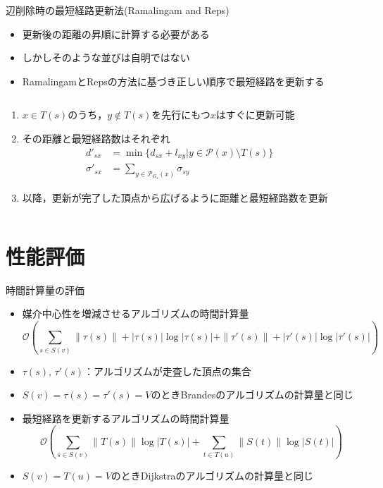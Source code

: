 \documentclass[dvipdfmx,fleqn]{beamer}
\begin{document}
\begin{frame}{辺削除時の最短経路更新法(Ramalingam and Reps)}
  \begin{itemize}
  \item 更新後の距離の昇順に計算する必要がある
  \item[] しかしそのような並びは\alert{自明ではない}
  \item RamalingamとRepsの方法に基づき正しい順序で最短経路を更新する
  \end{itemize}
  \begin{columns}
    \begin{column}{.60\textwidth}
      \begin{enumerate}
      \item $x\in T(s)$のうち，$y\notin T(s)$を先行にもつ$x$はすぐに更新可能
      \item その距離と最短経路数はそれぞれ
        \begin{equation*}
          \begin{aligned}
            d'_{sx}&=\min\{d_{sx}+l_{xy}|y\in\mathcal{P}(x)\setminus T(s)\} \\
            \sigma'_{sx}&=\sum_{y\in \mathcal{P}_{G_s}(x)}\sigma_{sy}
          \end{aligned}
        \end{equation*}
      \item 以降，更新が完了した頂点から広げるように距離と最短経路数を更新
      \end{enumerate}
    \end{column}
    \begin{column}{.39\textwidth}
      \centering
      \def\svgwidth{.95\columnwidth}
      
    \end{column}
  \end{columns}
\end{frame}

\section{性能評価}
\begin{frame}{時間計算量の評価}
  \begin{itemize}\small
    \item 媒介中心性を増減させるアルゴリズムの時間計算量
    \begin{equation*}
      \mathcal{O}\left(\sum_{s\in S(v)}\|\tau(s)\|+|\tau(s)|\log|\tau(s)|+\|\tau'(s)\|+|\tau'(s)|\log|\tau'(s)|\right)
    \end{equation*}
  \item[] $\tau(s),\,\tau'(s)$：アルゴリズムが走査した頂点の集合
  \item[] $S(v)=\tau(s)=\tau'(s)=V$のときBrandesのアルゴリズムの計算量と同じ
    \item 最短経路を更新するアルゴリズムの時間計算量
    \begin{equation*}
      \mathcal{O}\left(\sum_{s\in S(v)}\|T(s)\|\log|T(s)|+\sum_{t\in T(u)}\|S(t)\|\log|S(t)|\right)
    \end{equation*}
  \item[] $S(v)=T(u)=V$のときDijkstraのアルゴリズムの計算量と同じ
  \end{itemize}
\end{frame}
\end{document}
